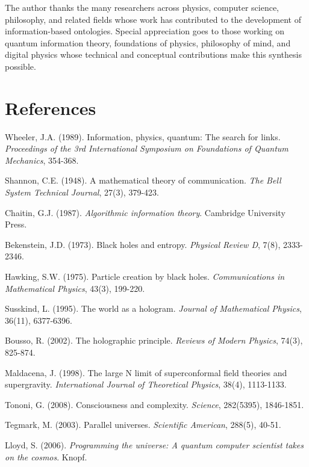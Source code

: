 \documentclass[12pt]{article}
\begin{document}
The author thanks the many researchers across physics, computer science, philosophy, and related fields whose work has contributed to the development of information-based ontologies. Special appreciation goes to those working on quantum information theory, foundations of physics, philosophy of mind, and digital physics whose technical and conceptual contributions make this synthesis possible.

\section*{References}

\begin{thebibliography}{99}

Wheeler, J.A. (1989). Information, physics, quantum: The search for links. \emph{Proceedings of the 3rd International Symposium on Foundations of Quantum Mechanics}, 354-368.

Shannon, C.E. (1948). A mathematical theory of communication. \emph{The Bell System Technical Journal}, 27(3), 379-423.

Chaitin, G.J. (1987). \emph{Algorithmic information theory}. Cambridge University Press.

Bekenstein, J.D. (1973). Black holes and entropy. \emph{Physical Review D}, 7(8), 2333-2346.

Hawking, S.W. (1975). Particle creation by black holes. \emph{Communications in Mathematical Physics}, 43(3), 199-220.

Susskind, L. (1995). The world as a hologram. \emph{Journal of Mathematical Physics}, 36(11), 6377-6396.

Bousso, R. (2002). The holographic principle. \emph{Reviews of Modern Physics}, 74(3), 825-874.

Maldacena, J. (1998). The large N limit of superconformal field theories and supergravity. \emph{International Journal of Theoretical Physics}, 38(4), 1113-1133.

Tononi, G. (2008). Consciousness and complexity. \emph{Science}, 282(5395), 1846-1851.

Tegmark, M. (2003). Parallel universes. \emph{Scientific American}, 288(5), 40-51.

Lloyd, S. (2006). \emph{Programming the universe: A quantum computer scientist takes on the cosmos}. Knopf.


\end{thebibliography}
\end{document}
